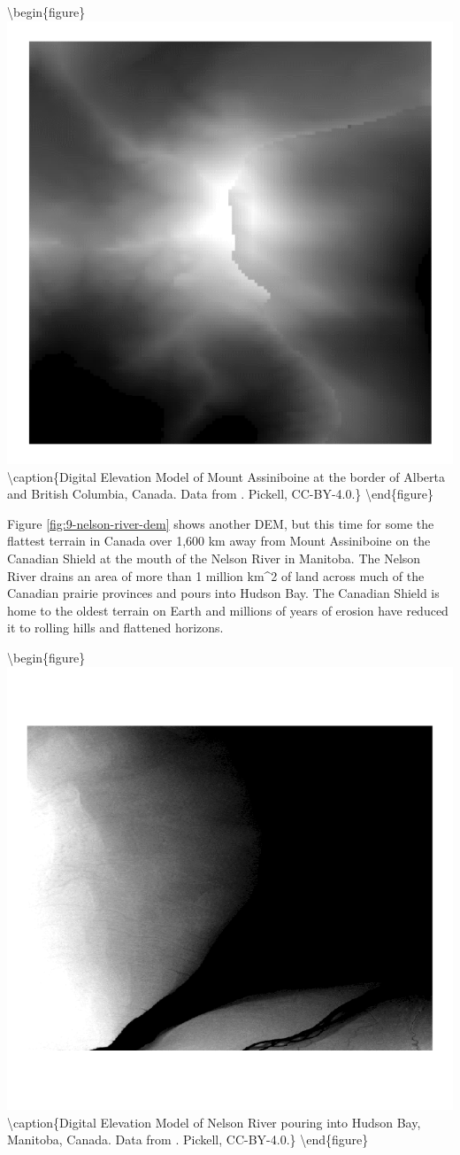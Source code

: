 \documentclass[
]{book}
\begin{document}
\textbackslash begin\{figure\}
\includegraphics[width=0.75\linewidth]{images/09-mount-assiniboine-dem} \textbackslash caption\{Digital Elevation Model of Mount Assiniboine at the border of Alberta and British Columbia, Canada. Data from \citet{natural_resources_canada_canadian_2015}. Pickell, CC-BY-4.0.\}\label{fig:9-mount-assiniboine-dem}
\textbackslash end\{figure\}

Figure \ref{fig:9-nelson-river-dem} shows another DEM, but this time for some the flattest terrain in Canada over 1,600 km away from Mount Assiniboine on the Canadian Shield at the mouth of the Nelson River in Manitoba. The Nelson River drains an area of more than 1 million km\^{}2 of land across much of the Canadian prairie provinces and pours into Hudson Bay. The Canadian Shield is home to the oldest terrain on Earth and millions of years of erosion have reduced it to rolling hills and flattened horizons.

\textbackslash begin\{figure\}
\includegraphics[width=0.75\linewidth]{images/09-nelson-river-dem} \textbackslash caption\{Digital Elevation Model of Nelson River pouring into Hudson Bay, Manitoba, Canada. Data from \citet{earth_resources_observation_and_science_center_usgs_2018}. Pickell, CC-BY-4.0.\}\label{fig:9-nelson-river-dem}
\textbackslash end\{figure\}
\end{document}
